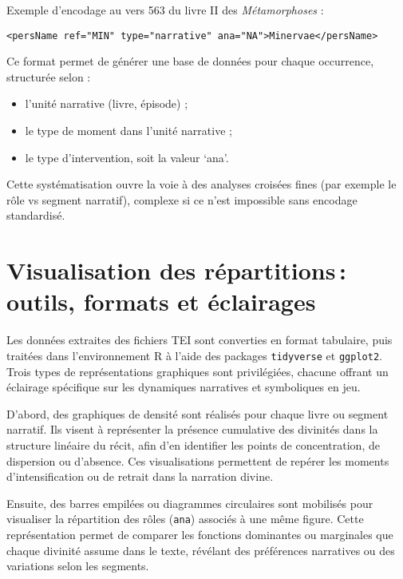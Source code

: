 \documentclass[
  letterpaper,
  DIV=11,
  numbers=noendperiod]{scrreprt}
\begin{document}
Exemple d'encodage au vers 563 du livre II des \emph{Métamorphoses} :

\begin{verbatim}
<persName ref="MIN" type="narrative" ana="NA">Minervae</persName>
\end{verbatim}

Ce format permet de générer une base de données pour chaque occurrence,
structurée selon :

\begin{itemize}
\item
  l'unité narrative (livre, épisode) ;
\item
  le type de moment dans l'unité narrative ;
\item
  le type d'intervention, soit la valeur `ana'.
\end{itemize}

Cette systématisation ouvre la voie à des analyses croisées fines (par
exemple le rôle vs segment narratif), complexe si ce n'est impossible
sans encodage standardisé.

\section{Visualisation des répartitions\,: outils, formats et
éclairages}\label{visualisation-des-ruxe9partitions-outils-formats-et-uxe9clairages}

Les données extraites des fichiers TEI sont converties en format
tabulaire, puis traitées dans l'environnement R à l'aide des packages
\texttt{tidyverse} et \texttt{ggplot2}. Trois types de représentations
graphiques sont privilégiées, chacune offrant un éclairage spécifique
sur les dynamiques narratives et symboliques en jeu.

D'abord, des graphiques de densité sont réalisés pour chaque livre ou
segment narratif. Ils visent à représenter la présence cumulative des
divinités dans la structure linéaire du récit, afin d'en identifier les
points de concentration, de dispersion ou d'absence. Ces visualisations
permettent de repérer les moments d'intensification ou de retrait dans
la narration divine.

Ensuite, des barres empilées ou diagrammes circulaires sont mobilisés
pour visualiser la répartition des rôles (\texttt{ana}) associés à une
même figure. Cette représentation permet de comparer les fonctions
dominantes ou marginales que chaque divinité assume dans le texte,
révélant des préférences narratives ou des variations selon les
segments.
\end{document}
